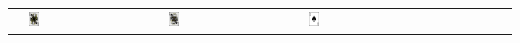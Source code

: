 \begin{tabular}{m{30mm}m{11mm}m{11mm}m{11mm}m{11mm}m{11mm}m{11mm}m{11mm}m{11mm}}
&
\includegraphics[width=0.08\textwidth]{./inf/SEKII/19_Java_Sortierverfahren/PikDame.png}
&
\includegraphics[width=0.08\textwidth]{./inf/SEKII/19_Java_Sortierverfahren/PikKoenig.png}
&
\includegraphics[width=0.08\textwidth]{./inf/SEKII/19_Java_Sortierverfahren/PikAs.png}
\\
\end{tabular}